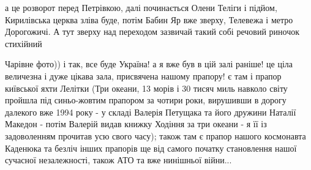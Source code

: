 
















а це розворот перед Петрівкою, далі починається Олени Теліги і підйом,
Кирилівська церква зліва буде, потім Бабин Яр вже зверху, Телевежа і метро
Дорогожичі. А тут зверху над переходом зазвичай такий собі речовий риночок
стихійний

Чарівне фото)) і так, все буде Україна! а я вже був в цій залі раніше! це ціла величезна і дуже цікава зала,
присвячена нашому прапору! є там і прапор київської яхти Лелітки (Три океани,
13 морів і 30 тисяч миль навколо світу пройшла під синьо-жовтим прапором за
чотири роки, вирушивши в дорогу далекого вже 1994 року - у складі Валерія
Петущака та його дружини Наталії Македон - потім Валерій видав книжку Ходіння
за три океани - я її із задоволенням прочитав усю свого часу); також там є
прапор нашого космонавта Каденюка та безліч інших прапорів ще від самого
початку становлення нашої сучасної незалежності, також АТО та вже нинішньої
війни...

